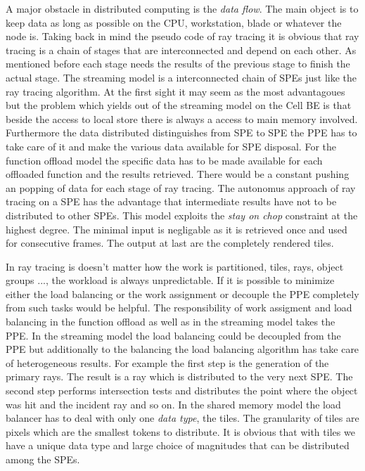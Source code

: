\documentclass[DIV10, abstracton, openright, footsepline, headsepline, twoside, 9pt,
bigheadings]{scrreprt}
\begin{document}
A major obstacle in distributed computing is the \textit{data flow}. The main object
 is to
keep data as long as possible on the CPU, workstation, blade or whatever the node
 is. Taking back in mind the pseudo code of ray tracing it is obvious that
ray tracing is a chain of stages that are interconnected and depend on each other.
As mentioned before each stage needs the results of the previous stage to finish
the actual stage. The streaming  model is a interconnected chain of SPEs just like
 the ray tracing algorithm. At the first sight it may seem as the most advantagoues
but the problem which yields out of
the streaming model on the Cell BE is that beside the access to local store there is
always a access to main memory involved. Furthermore the data distributed
distinguishes from SPE to SPE the PPE has to take care of it and make the various
data available for SPE disposal.
For the function offload model the specific data has to be made
available for each offloaded function and the results retrieved. There would be
a constant pushing an popping of data for each stage of ray tracing.
The autonomus approach of ray tracing on a SPE has the advantage that intermediate results
have not to be distributed to other SPEs. This model exploits the \textit{stay on chop}
constraint at the highest degree. The minimal input is negligable as it is
retrieved once and used for consecutive frames. The output at last are the completely
rendered tiles.


In ray tracing is doesn't matter how the work is partitioned, tiles, rays, object groups
..., the workload is always unpredictable. If it is possible to minimize either the load
 balancing or the work assignment or decouple the PPE completely from such tasks would
be helpful. The responsibility of work assigment and load balancing in the function
offload as well as in the streaming model takes the PPE. In the streaming model
the load balancing could be decoupled from the PPE but additionally to the balancing
the load balancing algorithm has take care of heterogeneous results. For example the first
step is the generation of the primary rays. The result is a ray which is distributed
to the very next SPE. The second step performs intersection tests and distributes the
point where  the object was hit and the incident ray and so on.
In the shared memory model the load balancer has to deal with only one \textit{data type},
the tiles. The granularity of tiles are pixels which are the smallest tokens to distribute.
It is obvious that with tiles we have a unique data type and large choice of magnitudes
that can be distributed among the SPEs.
\end{document}
